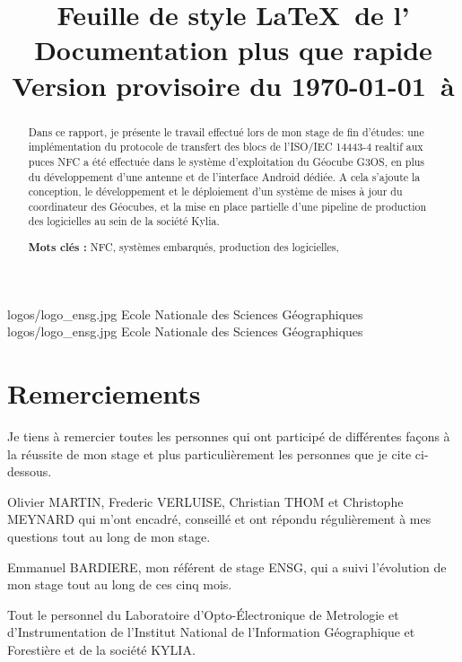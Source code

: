 \documentclass{themeensg}
\title{Feuille de style \LaTeX~de l'\ensg\\Documentation plus que rapide\\Version provisoire du \today~à \timenow}
\begin{document}
\begin{titlepage}
\enterprise 
{logos/logo_ensg.jpg}
{Ecole Nationale des Sciences Géographiques}
{logos/logo_ensg.jpg}
{Ecole Nationale des Sciences Géographiques}


\end{titlepage}




\chapter*{Remerciements}

Je tiens à remercier toutes les personnes qui ont participé de différentes façons à la réussite de mon stage et plus particulièrement les personnes que je cite ci-dessous.

Olivier MARTIN, Frederic VERLUISE, Christian THOM et Christophe MEYNARD qui m'ont encadré, conseillé et ont répondu régulièrement à mes questions tout au long de mon stage.

Emmanuel BARDIERE, mon référent de stage ENSG, qui a suivi l'évolution de mon stage tout au long de ces cinq mois.

Tout le personnel du Laboratoire d'Opto-Électronique de Metrologie et d'Instrumentation de l'Institut National de l'Information Géographique et Forestière et de la société KYLIA.


\begin{abstract}
\thispagestyle{empty}
	\vspace{1cm}

	Dans ce rapport, je présente le travail effectué lors de mon stage de fin d'études: une implémentation du protocole de transfert des blocs de l'ISO/IEC 14443-4 realtif aux puces NFC a été effectuée dans le système d'exploitation du Géocube G3OS, en plus du développement d'une antenne et de l'interface Android dédiée. A cela s'ajoute la conception, le développement et le déploiement d'un système de mises à jour du coordinateur des Géocubes, et la mise en place partielle d'une pipeline de production des logicielles au sein de la société Kylia.
	
	\vspace{1.5cm}
	
	\textbf{Mots clés :} NFC, systèmes embarqués, production des logicielles,
\end{abstract}
\end{document}

